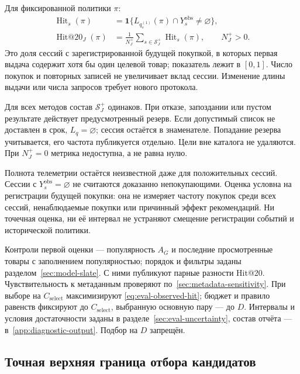 \documentclass[12pt,a4paper]{article}
\newcommand{\ind}{\mathbf 1}
\theoremstyle{plainru}
\begin{document}
Для фиксированной политики $\pi$:
\begin{align}
 \operatorname{Hit}_s(\pi)
 &=\ind\{L_{q_s^{(1)}}(\pi)\cap Y_s^{\mathrm{obs}}\ne\varnothing\},
 \label{eq:eval-session-hit}\\
 \operatorname{Hit@20}_J(\pi)
 &=\frac{1}{N_J^+}\sum_{s\in\mathcal S_J^+}\operatorname{Hit}_s(\pi),
 \qquad N_J^+>0.
 \label{eq:eval-observed-hit}
\end{align}
Это доля сессий с зарегистрированной будущей покупкой, в которых
первая выдача содержит хотя бы один целевой товар; показатель лежит
в $[0,1]$. Число покупок и повторных записей не увеличивает вклад сессии.
Изменение длины выдачи или числа запросов требует нового протокола.

Для всех методов состав $\mathcal S_J^+$ одинаков. При отказе,
запоздании или пустом результате действует предусмотренный резерв.
Если допустимый список не доставлен в срок, $L_q=\varnothing$;
сессия остаётся в знаменателе. Попадание резерва учитывается,
его частота публикуется отдельно. Цели вне каталога не удаляются.
При $N_J^+=0$ метрика недоступна, а не равна нулю.

Полнота телеметрии остаётся неизвестной даже для положительных сессий.
Сессии с $Y_s^{\mathrm{obs}}=\varnothing$ не считаются доказанно
непокупающими. Оценка условна на регистрации будущей покупки:
она не измеряет частоту покупок среди всех сессий, ненаблюдаемые покупки
или причинный эффект рекомендаций. Ни точечная оценка, ни её интервал
не устраняют смещение регистрации событий и исторической политики.

Контроли первой оценки --- популярность $A_G$ и последние просмотренные
товары с заполнением популярностью; порядок и фильтры заданы
разделом~\ref{sec:model-slate}. С ними публикуют парные разности Hit@20.
Чувствительность к метаданным проверяют по~\ref{sec:metadata-sensitivity}.
При выборе на $C_{\mathrm{select}}$ максимизируют
\eqref{eq:eval-observed-hit}; бюджет и правило равенств фиксируют до
$C_{\mathrm{select}}$, выбранную основную пару --- до $D$.
Интервалы и условия достаточности
заданы в разделе~\ref{sec:eval-uncertainty}, состав отчёта ---
в~\ref{app:diagnostic-output}. Подбор на $D$ запрещён.

\subsection{Точная верхняя граница отбора кандидатов}
\label{sec:eval-candidate-bound}
\end{document}
